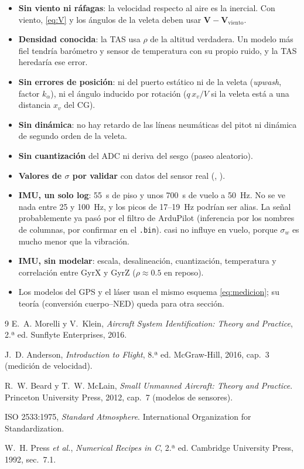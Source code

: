 \documentclass[11pt,a4paper]{article}
\begin{document}
\begin{itemize}
  \item \textbf{Sin viento ni ráfagas}: la velocidad respecto al aire es la
        inercial. Con viento, \eqref{eq:V} y los ángulos de la veleta deben
        usar $\bm V - \bm V_{\text{viento}}$.
  \item \textbf{Densidad conocida}: la TAS usa $\rho$ de la altitud verdadera.
        Un modelo más fiel tendría barómetro y sensor de temperatura con su
        propio ruido, y la TAS heredaría ese error.
  \item \textbf{Sin errores de posición}: ni del puerto estático ni de la veleta
        (\emph{upwash}, factor $k_\alpha$), ni el ángulo inducido por rotación
        ($q\,x_v/V$ si la veleta está a una distancia $x_v$ del CG).
  \item \textbf{Sin dinámica}: no hay retardo de las líneas neumáticas del pitot
        ni dinámica de segundo orden de la veleta.
  \item \textbf{Sin cuantización} del ADC ni deriva del sesgo (paseo aleatorio).
  \item \textbf{Valores de $\sigma$ por validar} con datos del sensor real
        (, ).
  \item \textbf{IMU, un solo log}: \SI{55}{s} de piso y unos \SI{700}{s} de vuelo a
        \SI{50}{Hz}. No se ve nada entre 25 y \SI{100}{Hz}, y los picos de
        17--\SI{19}{Hz} podrían ser alias. La señal probablemente ya pasó por el
        filtro de ArduPilot (inferencia por los nombres de columnas, por confirmar
        en el \texttt{.bin}).  casi no influye en vuelo,
        porque $\sigma_w$ es mucho menor que la vibración.
  \item \textbf{IMU, sin modelar}: escala, desalineación, cuantización, temperatura
        y correlación entre GyrX y GyrZ ($\rho\approx 0.5$ en reposo).
  \item Los modelos del GPS y el láser usan el mismo esquema
        \eqref{eq:medicion}; su teoría (conversión cuerpo--NED) queda para otra
        sección.
\end{itemize}

\begin{thebibliography}{9}
E.~A. Morelli y V.~Klein, \emph{Aircraft System Identification: Theory and
Practice}, 2.ª ed. Sunflyte Enterprises, 2016.

J.~D. Anderson, \emph{Introduction to Flight}, 8.ª ed. McGraw-Hill, 2016,
cap.~3 (medición de velocidad).

R.~W. Beard y T.~W. McLain, \emph{Small Unmanned Aircraft: Theory and
Practice}. Princeton University Press, 2012, cap.~7 (modelos de sensores).

ISO 2533:1975, \emph{Standard Atmosphere}. International Organization for
Standardization.

W.~H. Press \emph{et al.}, \emph{Numerical Recipes in C}, 2.ª ed. Cambridge
University Press, 1992, sec.~7.1.
\end{thebibliography}
\end{document}
